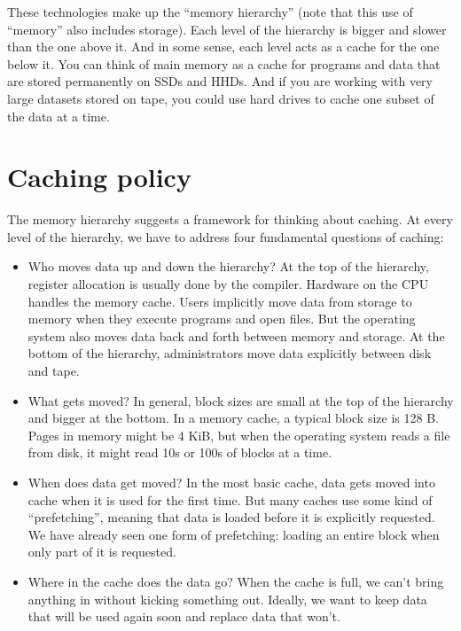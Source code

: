 \documentclass[12pt]{book}
\begin{document}
{These technologies make up the ``memory hierarchy'' (note that this
use of ``memory'' also includes storage).  Each
level of the hierarchy is bigger and slower than the one above it.
And in some sense, each level acts as a cache for the one below
it.  You can think of main memory as a cache for programs and data
that are stored permanently on SSDs and HHDs.  And if you are working
with very large datasets stored on tape, you could use hard drives
to cache one subset of the data at a time.


\section{Caching policy}

The memory hierarchy suggests a framework for thinking about
caching.  At every level of the hierarchy, we have to address
four fundamental questions of caching:

\begin{itemize}

\item Who moves data up and down the hierarchy?  At the top of the
  hierarchy, register allocation is usually done by the compiler.
  Hardware on the CPU handles the memory cache.  Users implicitly move
  data from storage to memory when they execute programs and open
  files.  But the operating system also moves data back and forth
  between memory and storage.  At the bottom of the hierarchy,
  administrators move data explicitly between disk and tape.

\item What gets moved?  In general, block sizes are small at the top
  of the hierarchy and bigger at the bottom.  In a memory cache, a
  typical block size is 128 B.  Pages in memory might be 4 KiB, but
  when the operating system reads a file from disk, it might read 10s
  or 100s of blocks at a time.

\item When does data get moved?  In the most basic cache, data gets
  moved into cache when it is used for the first time.  But many
  caches use some kind of ``prefetching'', meaning that data is
  loaded before it is explicitly requested.  We have already seen
  one form of prefetching: loading an entire block when only part of
  it is requested.

\item Where in the cache does the data go?  When the cache is full, we
  can't bring anything in without kicking something out.  Ideally,
  we want to keep data that will be used again soon and replace data
  that won't.


\end{itemize}}
\end{document}
